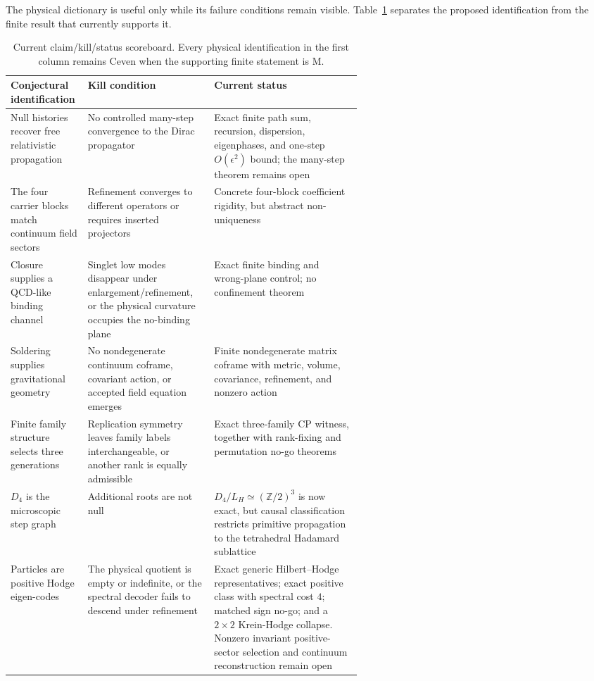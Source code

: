 \documentclass[11pt]{article}
\newcommand{\Mtag}{\textcolor{verified}{\textsc{M}}}
\newcommand{\Ctag}{\textcolor{conjectural}{\textsc{C}}}
\newcommand{\Z}{\mathbb{Z}}
\begin{document}
The physical dictionary is useful only while its failure conditions remain
visible.  Table~\ref{tab:scoreboard} separates the proposed identification from
the finite result that currently supports it.

\begin{table}[H]
\centering
\small
\begin{tabularx}{\linewidth}{@{}>{\raggedright\arraybackslash}p{0.22\linewidth}>{\raggedright\arraybackslash}p{0.36\linewidth}X@{}}
\toprule
Conjectural identification & Kill condition & Current status\\
\midrule
Null histories recover free relativistic propagation & No controlled
many-step convergence to the Dirac propagator & Exact finite path sum,
recursion, dispersion, eigenphases, and one-step $O(\epsilon^2)$ bound; the
many-step theorem remains open\\
The four carrier blocks match continuum field sectors &
Refinement converges to different operators or requires inserted projectors &
Concrete four-block coefficient rigidity, but abstract non-uniqueness\\
Closure supplies a QCD-like binding channel & Singlet low modes disappear
under enlargement/refinement, or the physical curvature occupies the no-binding
plane & Exact finite binding and wrong-plane control; no confinement theorem\\
Soldering supplies gravitational geometry & No nondegenerate continuum coframe,
covariant action, or accepted field equation emerges & Finite nondegenerate
matrix coframe with metric, volume, covariance, refinement, and nonzero action\\
Finite family structure selects three generations & Replication symmetry leaves
family labels interchangeable, or another rank is equally admissible & Exact
three-family CP witness, together with rank-fixing and permutation no-go theorems\\
$D_4$ is the microscopic step graph & Additional roots are not null &
$D_4/L_H\simeq(\Z/2)^3$ is now exact, but causal classification restricts
primitive propagation to the tetrahedral Hadamard sublattice\\
Particles are positive Hodge eigen-codes & The physical quotient is empty or
indefinite, or the spectral decoder fails to descend under refinement & Exact
generic Hilbert--Hodge representatives; exact positive class with spectral
cost $4$; matched sign no-go; and a $2\times2$ Krein-Hodge collapse.  Nonzero
invariant positive-sector selection and continuum reconstruction remain open\\
\bottomrule
\end{tabularx}
\caption{Current claim/kill/status scoreboard.  Every physical identification
in the first column remains \Ctag even when the supporting finite statement is
\Mtag.}
\label{tab:scoreboard}
\end{table}
\end{document}
